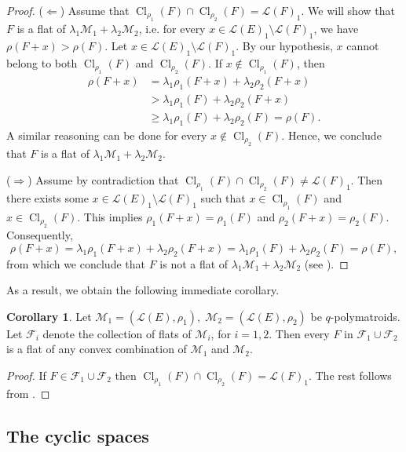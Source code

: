 \documentclass[a4paper,11pt,reqno]{amsart}
\theoremstyle{definition}
\newtheorem{corollary}[theorem]{{{Corollary}}}%
\newcommand{\mM}{\mathcal{M}}
\newcommand{\mL}{\mathcal{L}}
\newcommand{\mF}{\mathcal{F}}
\DeclareMathOperator{\Cl}{Cl}
\begin{document}
{\begin{proof}
 ({$\Longleftarrow$}) Assume that $\Cl_{\rho_1}(F)\cap\Cl_{\rho_2}(F)=\mL(F)_1$. We will show that $F$ is a flat of $\lambda_1\mM_1+\lambda_2\mM_2$, i.e.  for every $x\in\mL(E)_1\setminus\mL(F)_1$, we have $\rho(F+x)>\rho(F)$. Let $x\in\mL(E)_1\setminus\mL(F)_1$. By our hypothesis, $x$ cannot belong to both $\Cl_{\rho_1}(F)$ and $\Cl_{\rho_2}(F)$. If $x\not\in\Cl_{\rho_1}(F)$, then 
\begin{align*}
    \rho(F+x) &= \lambda_1\rho_1(F+x) + \lambda_2\rho_2(F+x) \\
    &> \lambda_1\rho_1(F) + \lambda_2\rho_2(F+x) \\
    &\geq \lambda_1\rho_1(F) + \lambda_2\rho_2(F)=\rho(F).
\end{align*}
A similar reasoning can be done for every $x\not\in\Cl_{\rho_2}(F)$. Hence, we conclude that $F$ is a flat of $\lambda_1\mM_1 +\lambda_2\mM_2$.

({$\Longrightarrow$}) Assume by contradiction that $\Cl_{\rho_1}(F)\cap\Cl_{\rho_2}(F)\ne\mL(F)_1$. 
Then there exists some $x \in \mL(E)_1 \setminus \mL(F)_1$ such that $x \in \Cl_{\rho_1}(F)$ and $x \in \Cl_{\rho_2}(F)$. This implies $\rho_1(F+x) = \rho_1(F)$ and $\rho_2(F+x) = \rho_2(F)$. Consequently, 
$$\rho(F+x) = \lambda_1\rho_1(F+x) + \lambda_2\rho_2(F+x) =\lambda_1\rho_1(F) + \lambda_2\rho_2(F) = \rho(F),$$
from which we conclude that $F$ is not a flat of $\lambda_1\mM_1+\lambda_2\mM_2$ (see ). 
\end{proof}

As a result, we obtain the following immediate corollary.

\begin{corollary}\label{coro:flats_conv_comb}
   Let $\mM_1=(\mL(E),\rho_1), \; \mM_2=(\mL(E),\rho_2)$ be $q$-polymatroids.  Let $\mF_i$ denote the collection of flats of $\mM_i$, for $i=1,2$. Then every $F$ in $\mF_1\cup\mF_2$ is a flat of any convex combination of $\mM_1$ and $\mM_2$.
\end{corollary}
\begin{proof}
    If $F\in\mF_1\cup\mF_2$ then  $\Cl_{\rho_1}(F)\cap\Cl_{\rho_2}(F)=\mL(F)_1$. The rest follows from . 
\end{proof}



\subsection{The cyclic spaces}\label{subsec: cyclic}

}
\end{document}
